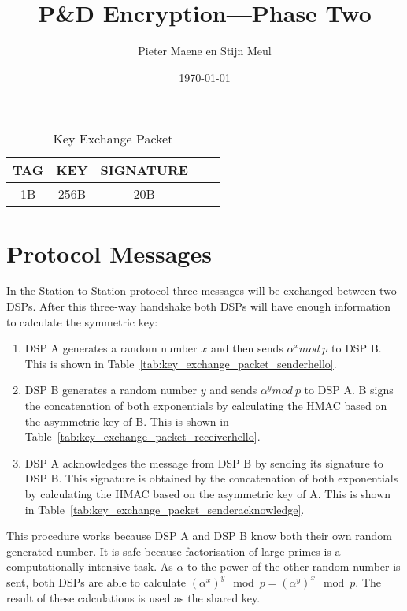 \documentclass[a4paper]{article}
\title{P\&D Encryption---Phase Two}
\author{Pieter Maene en Stijn Meul}
\date{\today}
\begin{document}
\maketitle

\begin{table}[H]
    \begin{center}
        \begin{tabular}{| c | c | c | c | c |}
            \hline
            TAG & KEY & SIGNATURE \\ \hline
            1B & 256B & 20B \\
            \hline
        \end{tabular}
    \end{center}
    
    \caption{Key Exchange Packet}
    \label{tab:key_exchange_packet}
\end{table}

\section{Protocol Messages}
In the Station-to-Station protocol three messages will be exchanged between two DSPs. After this three-way handshake both DSPs will have enough information to calculate the symmetric key:

\begin{enumerate}
 \item DSP A generates a random number $x$ and then sends $\alpha^x mod\ p$ to DSP B. This is shown in Table~\ref{tab:key_exchange_packet_senderhello}.
 \item DSP B generates a random number $y$ and sends $\alpha^y mod\ p$ to DSP A. B signs the concatenation of both exponentials by calculating the HMAC based on the asymmetric key of B. This is shown in Table~\ref{tab:key_exchange_packet_receiverhello}.
 \item DSP A acknowledges the message from DSP B by sending its signature to DSP B. This signature is obtained by the concatenation of both exponentials by calculating the HMAC based on the asymmetric key of A. This is shown in Table~\ref{tab:key_exchange_packet_senderacknowledge}.
\end{enumerate}
This procedure works because DSP A and DSP B know both their own random generated number. It is safe because factorisation of large primes is a computationally intensive task. As $\alpha$ to the power of the other random number is sent, both DSPs are able to calculate $\left(\alpha^{x}\right)^{y}\mod{p} = \left(\alpha^{y}\right)^{x}\mod{p}$. The result of these calculations is used as the shared key.
\end{document}
